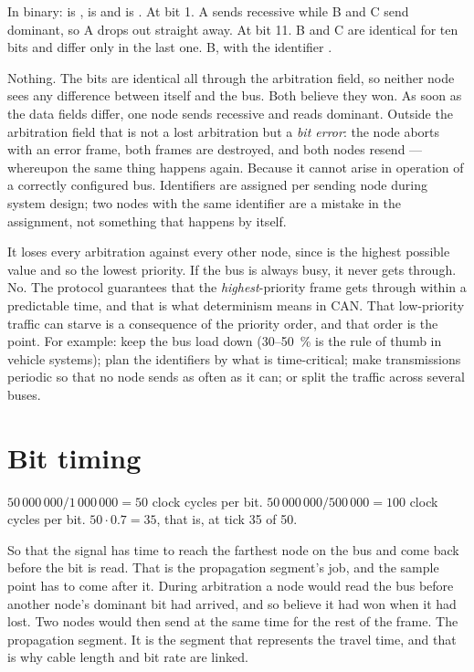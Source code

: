 In binary:  is ,  is  and  is
.
 At bit 1. A sends recessive while B and C send dominant, so A drops out straight away.
 At bit 11. B and C are identical for ten bits and differ only in the last one.
 B, with the identifier .

 Nothing. The bits are identical all through the arbitration field, so neither node sees any
difference between itself and the bus. Both believe they won.
 As soon as the data fields differ, one node sends recessive and reads dominant. Outside the
arbitration field that is not a lost arbitration but a \emph{bit error}: the node aborts with an
error frame, both frames are destroyed, and both nodes resend --- whereupon the same thing happens
again.
 Because it cannot arise in operation of a correctly configured bus. Identifiers are assigned
per sending node during system design; two nodes with the same identifier are a mistake in the
assignment, not something that happens by itself.

 It loses every arbitration against every other node, since  is the highest
possible value and so the lowest priority. If the bus is always busy, it never gets through.
 No. The protocol guarantees that the \emph{highest}-priority frame gets through within a
predictable time, and that is what determinism means in CAN. That low-priority traffic can starve is
a consequence of the priority order, and that order is the point.
 For example: keep the bus load down (30--50~\% is the rule of thumb in vehicle systems);
plan the identifiers by what is time-critical; make transmissions periodic so that no node sends as
often as it can; or split the traffic across several buses.

\section{Bit timing}

 $50\,000\,000 / 1\,000\,000 = 50$ clock cycles per bit.
 $50\,000\,000 / 500\,000 = 100$ clock cycles per bit.
 $50 \cdot 0.7 = 35$, that is, at tick 35 of 50.

 So that the signal has time to reach the farthest node on the bus and come back before the
bit is read. That is the propagation segment's job, and the sample point has to come after it.
 During arbitration a node would read the bus before another node's dominant bit had arrived,
and so believe it had won when it had lost. Two nodes would then send at the same time for the rest
of the frame.
 The propagation segment. It is the segment that represents the travel time, and that is why
cable length and bit rate are linked.

